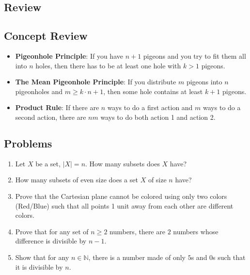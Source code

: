 \subsection{Review}
\begin{mdframed}[linewidth=1]
\section*{Concept Review}
\begin{itemize}
    \item \textbf{Pigeonhole Principle}: If you have $n + 1$ pigeons and you try to fit them all into $n$ holes, then there has to be at least one hole with $k > 1$ pigeons. 

    \item \textbf{The Mean Pigeonhole Principle}: If you distribute $m$ pigeons into $n$ pigeonholes and $m\geq k\cdot n +1$, then some hole contains at least $k+1$ pigeons. 

    \item \textbf{Product Rule}: If there are $n$ ways to do a first action and $m$ ways to do a second action, there are $nm$ ways to do both action 1 and action 2. 
\end{itemize}
\end{mdframed}


\newpage
\begin{mdframed}[linewidth=1]
\section*{Problems}
\begin{enumerate}
    \item Let $X$ be a set, $|X| = n$. How many subsets does $X$ have? 

    \item How many subsets of even size does a set $X$ of size $n$ have?

    \item Prove that the Cartesian plane cannot be colored using only two colors (Red/Blue) such that all points 1 unit away from each other are different colors. 

    \item Prove that for any set of $n \geq 2$ numbers, there are $2$ numbers whose difference is divisible by $n - 1$. 

    \item Show that for any $n \in \mathbb{N}$, there is a number made of only $5$s and $0$s such that it is divisible by $n$.  
\end{enumerate}
\end{mdframed}

